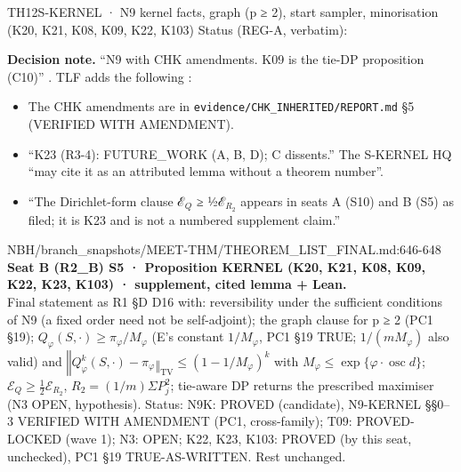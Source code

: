 \begin{card}{TH12}{S-KERNEL · N9 kernel facts, graph (p ≥ 2), start sampler, minorisation (K20, K21, K08, K09, K22, K103)}
\approvedFB\quad Status (REG-A, verbatim):  

\textbf{Decision note.} ``N9 with CHK amendments. K09 is the tie-DP proposition (C10)'' . TLF adds the following :
\begin{itemize}
\item The CHK amendments are in \texttt{evidence/CHK\_INHERITED/REPORT.md} §5 (VERIFIED WITH AMENDMENT).
\item ``K23 (R3-4): FUTURE\_WORK (A, B, D); C dissents.'' The S-KERNEL HQ ``may cite it as an attributed lemma without a theorem number''.
\item ``The Dirichlet-form clause ℰ$_Q$ ≥ ½ℰ$_{R_2}$ appears in seats A (S10) and B (S5) as filed; it is K23 and is not a numbered supplement claim.''
\end{itemize}

\begin{stmt}{NBH/branch_snapshots/MEET-THM/THEOREM_LIST_FINAL.md:646-648}
\textbf{Seat B (R2\_B) S5 · Proposition KERNEL (K20, K21, K08, K09, K22, K23, K103) · supplement, cited lemma + Lean.}\\
Final statement as R1 §D D16 with: reversibility under the sufficient conditions of N9 (a fixed order need not be self-adjoint); the graph clause for p ≥ 2 (PC1 §19); $Q_φ(S,\cdot) ≥ π_φ/M_φ$ (E's constant $1/M_φ$, PC1 §19 TRUE; $1/(mM_φ)$ also valid) and $‖Q_φ^k(S,\cdot) − π_φ‖_{\mathrm{TV}} ≤ (1 − 1/M_φ)^k$ with $M_φ ≤ \exp\{φ\cdot\operatorname{osc} d\}$; $ℰ_Q ≥ \tfrac12ℰ_{R_2}$, $R_2 = (1/m)ΣP_j^2$; tie-aware DP returns the prescribed maximiser (N3 OPEN, hypothesis). Status: N9K: PROVED (candidate), N9-KERNEL §§0–3 VERIFIED WITH AMENDMENT (PC1, cross-family); T09: PROVED-LOCKED (wave 1); N3: OPEN; K22, K23, K103: PROVED (by this seat, unchecked), PC1 §19 TRUE-AS-WRITTEN. Rest unchanged.
\end{stmt}


\end{card}
